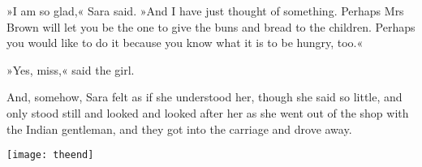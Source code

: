 »I am so glad,« Sara said. »And I have just thought of something. Perhaps Mrs Brown will let you be the one to give the buns and bread to the children. Perhaps you would like to do it because you know what it is to be hungry, too.«

»Yes, miss,« said the girl.

And, somehow, Sara felt as if she understood her, though she said so little, and only stood still and looked and looked after her as she went out of the shop with the Indian gentleman, and they got into the carriage and drove away.

\vfill
\begin{center}
\texttt{[image: theend]}
\end{center}